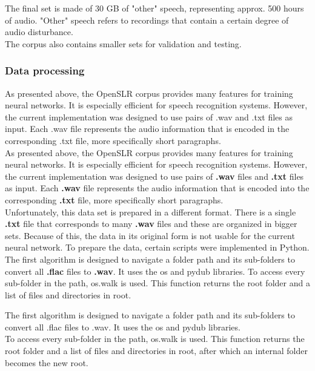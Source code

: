 The final set is made of 30 GB of "other" speech, representing approx. 500 hours of audio. "Other" speech refers to recordings that contain a certain degree of audio disturbance.\\

The corpus also contains smaller sets for validation and testing.\\

\subsubsection{Data processing}

As presented above, the OpenSLR corpus provides many features for training neural networks. It is especially efficient for speech recognition systems. However, the current implementation was designed to use pairs of .wav and .txt files as input. Each .wav file represents the audio information that is encoded in the corresponding .txt file, more specifically short paragraphs.\\

As presented above, the OpenSLR corpus provides many features for training neural networks. It is especially efficient for speech recognition systems. However, the current implementation was designed to use pairs of \textbf{.wav} files and \textbf{.txt} files as input. Each \textbf{.wav} file represents the audio information that is encoded into the corresponding \textbf{.txt} file, more specifically short paragraphs.\\

Unfortunately, this data set is prepared in a different format. There is a single \textbf{.txt} file that corresponds to many \textbf{.wav} files and these are organized in bigger sets. Because of this, the data in its original form is not usable for the current neural network. To prepare the data, certain scripts were implemented in Python.\\

The first algorithm is designed to navigate a folder path and its sub-folders to convert all \textbf{.flac} files to \textbf{.wav}. It uses the os and pydub libraries. 
To access every sub-folder in the path, os.walk is used. This function returns the root folder and a list of files and directories in root. 

The first algorithm is designed to navigate a folder path and its sub-folders to convert all .flac files to .wav. It uses the os and pydub libraries.  \\
To access every sub-folder in the path, os.walk is used. This function returns the root folder and a list of files and directories in root, after which an internal folder becomes the new root.


